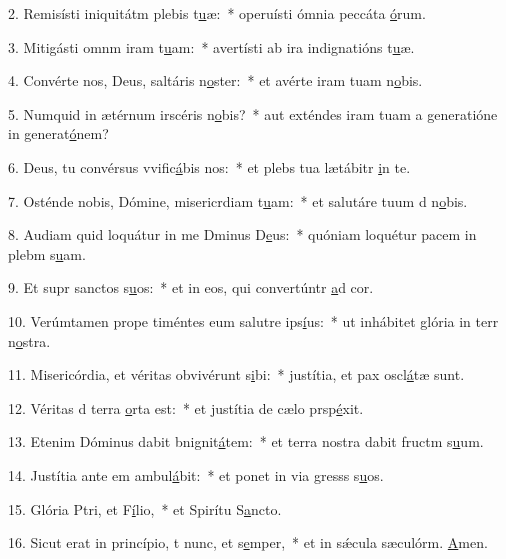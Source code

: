 2. Remisísti iniquitátm plebis t\uline{u}æ:~* operuísti ómnia peccáta \uline{ó}rum.\par 
3. Mitigásti omnm iram t\uline{u}am:~* avertísti ab ira indignatións t\uline{u}æ.\par 
4. Convérte nos, Deus, saltáris n\uline{o}ster:~* et avérte iram tuam  n\uline{o}bis.\par 
5. Numquid in ætérnum irscéris n\uline{o}bis?~* aut exténdes iram tuam a generatióne in generat\uline{ó}nem?\par 
6. Deus, tu convérsus vvific\uline{á}bis nos:~* et plebs tua lætábitr \uline{i}n te.\par 
7. Osténde nobis, Dómine, misericrdiam t\uline{u}am:~* et salutáre tuum d n\uline{o}bis.\par 
8. Audiam quid loquátur in me Dminus D\uline{e}us:~* quóniam loquétur pacem in plebm s\uline{u}am.\par 
9. Et supr sanctos s\uline{u}os:~* et in eos, qui convertúntr \uline{a}d cor.\par 
10. Verúmtamen prope timéntes eum salutre ips\uline{í}us:~* ut inhábitet glória in terr n\uline{o}stra.\par 
11. Misericórdia, et véritas obvivérunt s\uline{i}bi:~* justítia, et pax oscl\uline{á}tæ sunt.\par 
12. Véritas d terra \uline{o}rta est:~* et justítia de cælo prsp\uline{é}xit.\par 
13. Etenim Dóminus dabit bnignit\uline{á}tem:~* et terra nostra dabit fructm s\uline{u}um.\par 
14. Justítia ante em ambul\uline{á}bit:~* et ponet in via gresss s\uline{u}os.\par 
15. Glória Ptri, et F\uline{í}lio,~* et Spirítu S\uline{a}ncto.\par 
16. Sicut erat in princípio, t nunc, et s\uline{e}mper,~* et in sǽcula sæculórm. \uline{A}men.\par 

